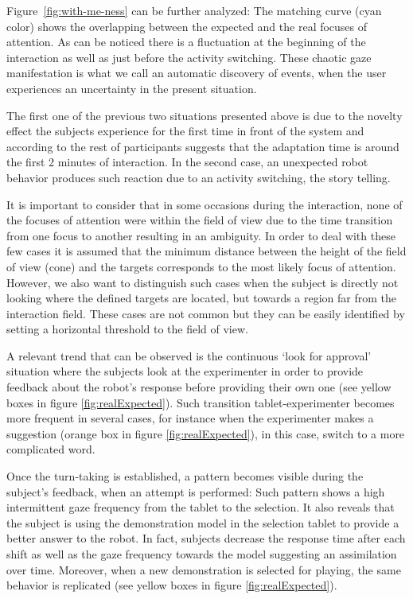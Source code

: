 \documentclass{sig-alternate}
\begin{document}
Figure~\ref{fig:with-me-ness} can be further analyzed:
The matching curve (cyan color) shows the overlapping between the
expected and the real focuses of attention. As can be noticed there is a
fluctuation at the beginning of the interaction as well as just before the
activity switching. These chaotic gaze manifestation is what we call an
automatic discovery of events, when the user experiences an uncertainty in the
present situation. 

The first one of the previous two situations presented above is due to the
novelty effect the subjects experience for the first time in front of the system
and according to the rest of participants suggests that the adaptation time is
around the first 2 minutes of interaction. In the second case, an unexpected
robot behavior produces such reaction due to an activity switching, the story
telling.

It is important to consider that in some occasions during the interaction, none
of the focuses of attention were within the field of view due to the time
transition from one focus to another resulting in an ambiguity. In order to deal
with these few cases it is assumed that the minimum distance between the height
of the field of view (cone) and the targets corresponds to the most likely focus
of attention. However, we also want to distinguish such cases when the subject
is directly not looking where the defined targets are located, but towards a
region far from the interaction field. These cases are not common but they can
be easily identified by setting a horizontal threshold to the field of view.

A relevant trend that can be observed is the continuous `look for approval'
situation where the subjects look at the experimenter in order to provide
feedback about the robot's response before providing their own one (see yellow
boxes in figure \ref{fig:realExpected}). Such transition tablet-experimenter
becomes more frequent in several cases, for instance when the experimenter makes
a suggestion (orange box in figure \ref{fig:realExpected}), in this case, switch
to a more complicated word.

Once the turn-taking is established, a pattern becomes visible during the
subject's feedback, when an attempt is performed: Such pattern shows a high
intermittent gaze frequency from the tablet to the selection. It also reveals
that the subject is using the demonstration model in the selection tablet to
provide a better answer to the robot. In fact, subjects decrease the response
time after each shift as well as the gaze frequency towards the model suggesting
an assimilation over time. Moreover, when a new demonstration is selected for
playing, the same behavior is replicated (see yellow boxes in figure
\ref{fig:realExpected}).
\end{document}
